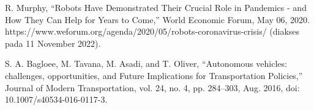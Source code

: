 R. Murphy, “Robots Have Demonstrated Their Crucial Role in Pandemics - and How They Can Help for Years to Come,” World Economic Forum, May 06, 2020. https://www.weforum.org/agenda/2020/05/robots-coronavirus-crisis/ (diakses pada 11 November 2022).

S. A. Bagloee, M. Tavana, M. Asadi, and T. Oliver, “Autonomous vehicles: challenges, opportunities, and Future Implications for Transportation Policies,” Journal of Modern Transportation, vol. 24, no. 4, pp. 284–303, Aug. 2016, doi: 10.1007/s40534-016-0117-3.